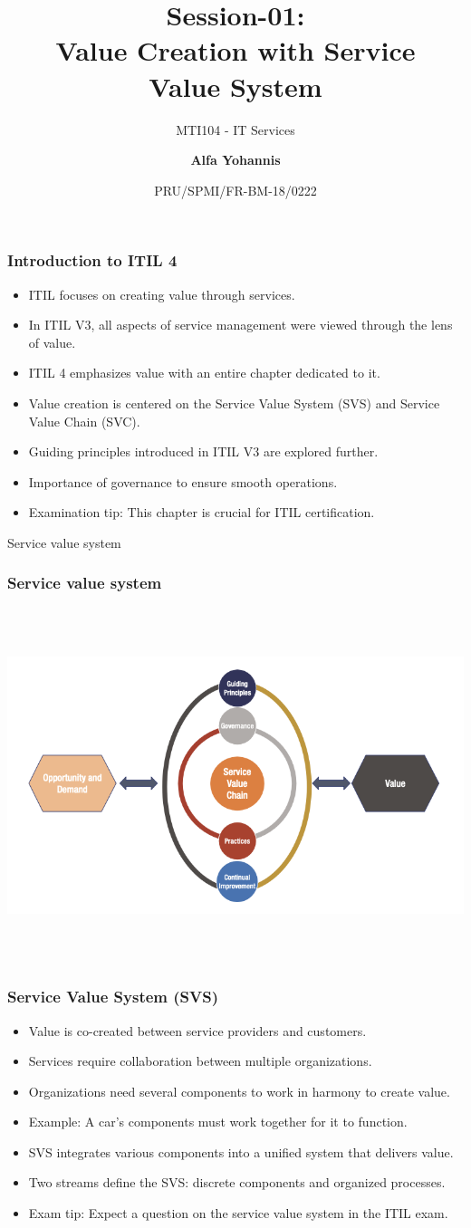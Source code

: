 \documentclass[aspectratio=169, table]{beamer}
\subtitle{MTI104 - IT Services}
\title{Session-01:\\\LARGE{Value Creation with Service \\Value System}}
\date[Serial]{\scriptsize {PRU/SPMI/FR-BM-18/0222}}
\author[Pradita]{\small{\textbf{Alfa Yohannis}}}
\begin{document}
\frame{\titlepage}

\begin{frame}
	\frametitle{Introduction to ITIL 4}
	\begin{itemize}
		\item ITIL focuses on creating value through services.
		\item In ITIL V3, all aspects of service management were viewed through the lens of value.
		\item ITIL 4 emphasizes value with an entire chapter dedicated to it.
		\item Value creation is centered on the Service Value System (SVS) and Service Value Chain (SVC).
		\item Guiding principles introduced in ITIL V3 are explored further.
		\item Importance of governance to ensure smooth operations.
		\item Examination tip: This chapter is crucial for ITIL certification.
	\end{itemize}
\end{frame}

\begin{frame}{Service value system} 	 \frametitle{ Service value system} \begin{center} 	\includegraphics[width=0.6\linewidth]{images/image-01.png} \end{center} \end{frame}

\begin{frame}
	\frametitle{Service Value System (SVS)}
	\begin{itemize}
		\item Value is co-created between service providers and customers.
		\item Services require collaboration between multiple organizations.
		\item Organizations need several components to work in harmony to create value.
		\item Example: A car's components must work together for it to function.
		\item SVS integrates various components into a unified system that delivers value.
		\item Two streams define the SVS: discrete components and organized processes.
		\item Exam tip: Expect a question on the service value system in the ITIL exam.
	\end{itemize}
\end{frame}
\end{document}
